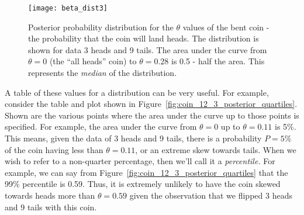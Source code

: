 \begin{figure}
\texttt{[image: beta\_dist3]}
\caption{Posterior probability distribution for the $\theta$ values of the bent coin - the probability that the coin will land heads.  The distribution is shown for data 3 heads and 9 tails.  The area under the curve from  $\theta=0$ (the ``all heads'' coin) to $\theta=0.28$ is 0.5 - half the area.  This represents the {\em median} of the distribution.}
\label{fig:coin_12_3_posterior_median}
\end{figure}

A table of these values for a distribution can be very useful.  For example, consider the table and plot shown in Figure~\ref{fig:coin_12_3_posterior_quartiles}.  Shown are the various points where the area under the curve up to those points is specified.  For example, the area under the curve from $\theta=0$ up to $\theta=0.11$ is 5\%.  This means, given the data of 3 heads and 9 tails, there is a probability $P=5\%$ of the coin having less than $\theta=0.11$, or an extreme skew towards tails.    When we wish to refer to a non-quarter percentage, then we'll call it a {\em percentile.}      For example, we can say from Figure~\ref{fig:coin_12_3_posterior_quartiles} that the 99\% percentile is 0.59.  Thus, it is extremely unlikely to have the coin skewed towards heads more than $\theta=0.59$ given the observation that we flipped 3 heads and 9 tails with this coin.


